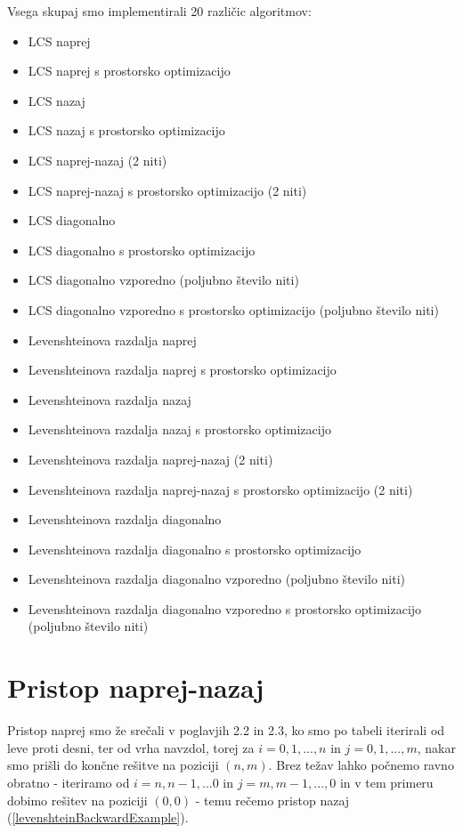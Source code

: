 \documentclass[a4paper,12pt,openright]{book}
\begin{document}
Vsega skupaj smo implementirali 20 različic algoritmov:
\begin{itemize}
  \item LCS naprej 
  \item LCS naprej s prostorsko optimizacijo
  \item LCS nazaj 
  \item LCS nazaj s prostorsko optimizacijo
  \item LCS naprej-nazaj (2 niti)
  \item LCS naprej-nazaj s prostorsko optimizacijo (2 niti)
  \item LCS diagonalno
  \item LCS diagonalno s prostorsko optimizacijo
  \item LCS diagonalno vzporedno (poljubno število niti)
  \item LCS diagonalno vzporedno s prostorsko optimizacijo (poljubno število niti)
  \item Levenshteinova razdalja naprej 
  \item Levenshteinova razdalja naprej s prostorsko optimizacijo
  \item Levenshteinova razdalja nazaj 
  \item Levenshteinova razdalja nazaj s prostorsko optimizacijo
  \item Levenshteinova razdalja naprej-nazaj (2 niti)
  \item Levenshteinova razdalja naprej-nazaj s prostorsko optimizacijo (2 niti)
  \item Levenshteinova razdalja diagonalno
  \item Levenshteinova razdalja diagonalno s prostorsko optimizacijo
  \item Levenshteinova razdalja diagonalno vzporedno (poljubno število niti)
  \item Levenshteinova razdalja diagonalno vzporedno s prostorsko optimizacijo (poljubno število niti)
\end{itemize}

\section{Pristop naprej-nazaj}

Pristop naprej smo že srečali v poglavjih 2.2 in 2.3, ko smo po tabeli iterirali od leve proti desni, ter od vrha navzdol, torej za $i = 0, 1, ..., n$ in $j = 0, 1, ..., m$, nakar smo prišli do končne rešitve na poziciji $(n, m)$. Brez težav lahko počnemo ravno obratno - iteriramo od $i = n, n-1, ... 0$ in $j = m, m-1, ..., 0$ in v tem primeru dobimo rešitev na poziciji $(0, 0)$ - temu rečemo pristop nazaj (\ref{levenshteinBackwardExample}). 
\end{document}
